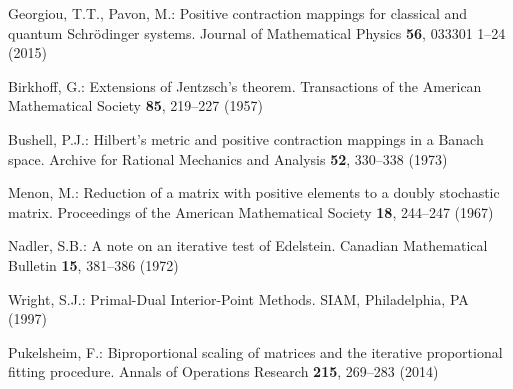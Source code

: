 \documentclass{article}
\theoremstyle{definition}
\begin{document}
\begin{thebibliography}{10}
Georgiou, T.T., Pavon, M.: Positive contraction mappings for classical and
  quantum {Schr{\"o}dinger} systems.
\newblock Journal of Mathematical Physics \textbf{56}, 033\mbox{}301 1--24
  (2015)

Birkhoff, G.: Extensions of {Jentzsch's} theorem.
\newblock Transactions of the American Mathematical Society \textbf{85},
  219--227 (1957)

Bushell, P.J.: Hilbert's metric and positive contraction mappings in a {Banach}
  space.
\newblock Archive for Rational Mechanics and Analysis \textbf{52}, 330--338
  (1973)

Menon, M.: Reduction of a matrix with positive elements to a doubly stochastic
  matrix.
\newblock Proceedings of the American Mathematical Society \textbf{18},
  244--247 (1967)

Nadler, S.B.: A note on an iterative test of {E}delstein.
\newblock Canadian Mathematical Bulletin \textbf{15}, 381--386 (1972)

Wright, S.J.: Primal-Dual Interior-Point Methods.
\newblock SIAM, Philadelphia, PA (1997)

Pukelsheim, F.: Biproportional scaling of matrices and the iterative
  proportional fitting procedure.
\newblock Annals of Operations Research \textbf{215}, 269--283 (2014)

\end{thebibliography}
\end{document}
